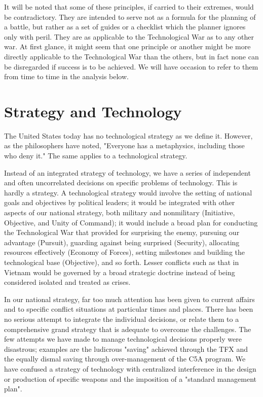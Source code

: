 It will be noted that some of these principles, if carried to their extremes, would be contradictory. They are intended to serve not as a formula for the planning of a battle, but rather as a set of guides or a checklist which the planner ignores only with peril. They are as applicable to the Technological War as to any other war. At first glance, it might seem that one principle or another might be more directly applicable to the Technological War than the others, but in fact none can be disregarded if success is to be achieved. We will have occasion to refer to them from time to time in the analysis below.

\section{Strategy and Technology}
The United States today has no technological strategy as we define it. However, as the philosophers have noted, "Everyone has a metaphysics, including those who deny it." The same applies to a technological strategy.

Instead of an integrated strategy of technology, we have a series of independent and often uncorrelated decisions on specific problems of technology. This is hardly a strategy. A technological strategy would involve the setting of national goals and objectives by political leaders; it would be integrated with other aspects of our national strategy, both military and nonmilitary (Initiative, Objective, and Unity of Command); it would include a broad plan for conducting the Technological War that provided for surprising the enemy, pursuing our advantage (Pursuit), guarding against being surprised (Security), allocating resources effectively (Economy of Forces), setting milestones and building the technological base (Objective), and so forth. Lesser conflicts such as that in Vietnam would be governed by a broad strategic doctrine instead of being considered isolated and treated as crises.

In our national strategy, far too much attention has been given to current affairs and to specific conflict situations at particular times and places. There has been no serious attempt to integrate the individual decisions, or relate them to a comprehensive grand strategy that is adequate to overcome the challenges. The few attempts we have made to manage technological decisions properly were disastrous; examples are the ludicrous "saving" achieved through the TFX and the equally dismal saving through over-management of the C5A program. We have confused a strategy of technology with centralized interference in the design or production of specific weapons and the imposition of a "standard management plan".

